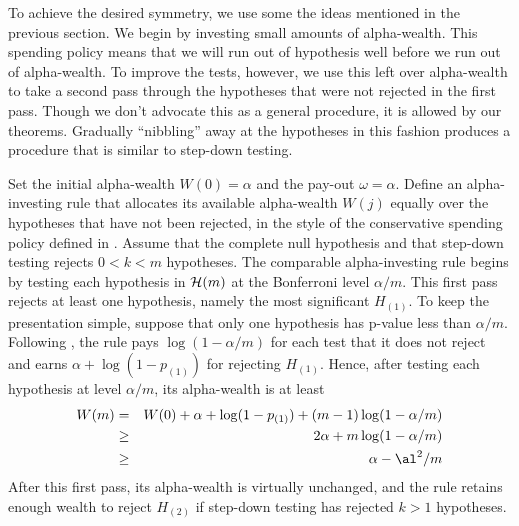 \documentclass[12pt]{article}
\begin{document}
To achieve the desired symmetry, we use some the ideas mentioned in
 the previous section.  We begin by investing small amounts of alpha-wealth.
  This spending policy means that we will run out of hypothesis well before we run out of alpha-wealth.  To improve the tests, however, we use this left over alpha-wealth to take a second pass through the hypotheses that were not rejected in the first pass.  Though we don't advocate this as a general procedure, it is allowed by our theorems. Gradually ``nibbling'' away at the hypotheses in this fashion produces a procedure that is similar to step-down
testing.  

Set the initial alpha-wealth $W(0) = \alpha$ and the pay-out $\omega = \alpha$.
  Define an alpha-investing rule that allocates its available alpha-wealth
 $W(j)$ equally over the hypotheses that have not been rejected, in the style of the conservative spending policy defined in .  Assume that the complete null hypothesis and that step-down testing rejects $0 < k < m$ hypotheses.  The comparable alpha-investing rule begins by testing each hypothesis in ${\cal H}(m)$ at the Bonferroni level $\alpha/m$. This first pass rejects at least one hypothesis, namely the most significant $H_{(1)}$.  To keep the presentation simple, suppose that only one hypothesis has p-value less than $\alpha/m$.  Following , the rule pays $\log(1-\alpha/m)$ for each test that it does not reject and earns $\alpha + \log(1-p_{(1)})$ for rejecting $H_{(1)}$.  Hence, after testing each hypothesis at level $\alpha/m$, its alpha-wealth is at least
\begin{eqnarray}
 W(m) 
   &=& W(0) + \alpha + \log (1-p_{(1)}) + (m-1) \log(1-\alpha/m) \cr
   &\ge& 2\alpha + m \log(1-\alpha/m)                            \cr
   &\ge& \alpha - \al^2/m
\label{eq:approx}
\end{eqnarray}
After this first pass, its alpha-wealth is virtually unchanged, and the rule retains enough wealth to reject $H_{(2)}$ if step-down testing has rejected $k > 1$ hypotheses.
\end{document}
